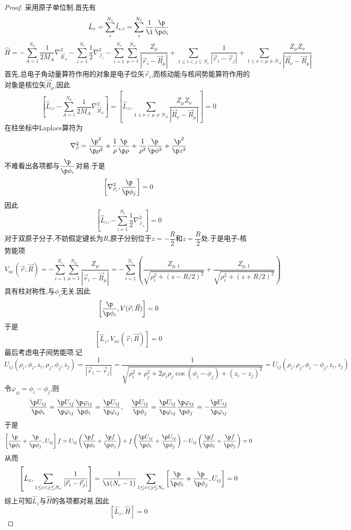 \documentclass{ctexart}
\begin{document}
\begin{proof}
    采用原子单位制.首先有
    \[\hat{L}_z=\sum_{i}^{N_e}\hat{l}_{z,i}=\sum_{i}^{N_e}\dfrac{1}{\i}\dfrac{\p}{\p\phi_i}\]
    \[\hat{H}=-\sum_{A=1}^{N_n}\dfrac{1}{2M_A}\nabla_{\vec{R}_A}^2-\sum_{i=1}^{N_e}\dfrac{1}{2}\nabla_{\vec{r}_i}^2-\sum_{i=1}^{N_e}\sum_{\mu=1}^{N_n}\dfrac{Z_\mu}{\left|\vec{r}_i-\vec{R}_{\mu}\right|}+\sum_{1\leq i<j\leq N_e}\dfrac{1}{\left|\vec{r}_i-\vec{r}_j\right|}+\sum_{1\leq\nu<\mu\neq N_A}\dfrac{Z_\mu Z_\nu}{\left|\vec{R}_\nu-\vec{R}_\mu\right|}\]
    \indent 首先,总电子角动量算符作用的对象是电子位矢$\vec{r}_i$,而核动能与核间势能算符作用的对象是核位矢$\vec{R}_\mu$,因此
    \[\left[\hat{L}_z,-\sum_{A=1}^{N_n}\dfrac{1}{2M_A}\nabla_{\vec{R}_A}^2\right]=\left[\hat{L}_z,\sum_{1\leq\nu<\mu\neq N_A}\dfrac{Z_\mu Z_\nu}{\left|\vec{R}_\nu-\vec{R}_\mu\right|}\right]=0\]
    \indent 在柱坐标中Laplace算符为
    \[\nabla_{\vec{r}}^2=\dfrac{\p^2}{\p\rho^2}+\dfrac{1}{\rho}\dfrac{\p}{\p\rho}+\dfrac{1}{\rho^2}\dfrac{\p}{\p\phi^2}+\dfrac{\p^2}{\p z^2}\]
    不难看出各项都与$\dfrac{\p}{\p\phi_i}$对易.于是
    \[\left[\nabla^2_{{\vec{r}_i}},\dfrac{\p}{\p\phi_j}\right]=0\]
    因此
    \[\left[\hat{L}_z,-\sum_{i=1}^{N_e}\dfrac{1}{2}\nabla_{\vec{r}_i}^2\right]=0\]
    \indent 对于双原子分子,不妨假定键长为$R$,原子分别位于$z=-\dfrac{R}{2}$和$z=\dfrac{R}{2}$处.于是电子-核势能项
    \[V_{ne}(\vec{r};\vec{R})=-\sum_{i=1}^{N_e}\sum_{\mu=1}^{N_n}\dfrac{Z_\mu}{\left|\vec{r}_i-\vec{R}_{\mu}\right|}=-\sum_{i=1}^{N_e}\left(\dfrac{Z_{\mu,1}}{\sqrt{\rho_i^2+\left(z-R/2\right)^2}}+\dfrac{Z_{\mu,1}}{\sqrt{\rho_i^2+\left(z+R/2\right)^2}}\right)\]
    具有柱对称性,与$\phi_i$无关.因此
    \[\left[\dfrac{\p}{\p\phi_i},V(\vec{r};\vec{R})\right]=0\]
    于是
    \[\left[\hat{L}_z,V_{ne}(\vec{r};\vec{R})\right]=0\]
    \indent 最后考虑电子间势能项.记
    \[U_{ij}(\rho_i,\phi_i,z_i,\rho_j,\phi_j,z_j)=\dfrac{1}{\left|\vec{r}_i-\vec{r}_j\right|}=\dfrac{1}{\sqrt{\rho_i^2+\rho_j^2+2\rho_i\rho_j\cos(\phi_i-\phi_j)+(z_i-z_j)^2}}=U_{ij}(\rho_i,\rho_j,\phi_i-\phi_j,z_i,z_j)\]
    令$\varphi_{ij}=\phi_i-\phi_j$,则
    \[\dfrac{\p U_{ij}}{\p\phi_i}=\dfrac{\p U_{ij}}{\p\varphi_{ij}}\dfrac{\p\varphi_{ij}}{\p\phi_i}=\dfrac{\p U_{ij}}{\p\varphi_{ij}},\quad\dfrac{\p U_{ij}}{\p\phi_j}=\dfrac{\p U_{ij}}{\p\varphi_{ij}}\dfrac{\p\varphi_{ij}}{\p\phi_j}=-\dfrac{\p U_{ij}}{\p\varphi_{ij}}\]
    于是
    \[\left[\dfrac{\p}{\p\phi_i}+\dfrac{\p}{\p\phi_j},U_{ij}\right]f
    =U_{ij}\left(\dfrac{\p f}{\p\phi_i}+\dfrac{\p f}{\p\phi_j}\right)+f\left(\dfrac{\p U_{ij}}{\p\phi_i}+\dfrac{\p U_{ij}}{\p\phi_j}\right)-U_{ij}\left(\dfrac{\p f}{\p\phi_i}+\dfrac{\p f}{\p\phi_j}\right)=0\]
    从而
    \[\left[\hat{L}_z,\sum_{1\leq i<j\leq N_e}\dfrac{1}{\left|\vec{r}_i-\vec{r}_j\right|}\right]=\dfrac{1}{\i(N_e-1)}\sum_{1\leq i<j\leq N_e}\left[\dfrac{\p}{\p\phi_i}+\dfrac{\p}{\p\phi_j},U_{ij}\right]=0\]
    \indent 综上可知$\hat{L}_z$与$\hat{H}$的各项都对易,因此
    \[\left[\hat{L}_z,\hat{H}\right]=0\]
\end{proof}
\end{document}
